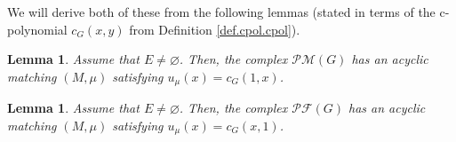\documentclass[12pt]{amsart}
\newtheorem{lemma}[theorem]{Lemma}
\theoremstyle{definition}
\newcommand{\Pm}[1]{\mathcal{PM}\left(#1\right)}
\newcommand{\Pf}[1]{\mathcal{PF}\left(#1\right)}
\begin{document}
We will derive both of these from the following lemmas (stated in terms of the
c-polynomial $c_{G}\left(  x,y\right)  $ from Definition \ref{def.cpol.cpol}).

\begin{lemma}
\label{lem.PM.morse-c}Assume that $E\neq\varnothing$. Then, the complex
$\Pm{G}$ has an acyclic matching $\left(
M,\mu\right)  $ satisfying $u_{\mu}\left(  x\right)  =c_{G}\left(  1,x\right)
$.
\end{lemma}

\begin{lemma}
\label{lem.PF.morse-c}Assume that $E\neq\varnothing$. Then, the complex
$\Pf{G}$ has an acyclic matching $\left(
M,\mu\right)  $ satisfying $u_{\mu}\left(  x\right)  =c_{G}\left(  x,1\right)
$.
\end{lemma}
\end{document}
